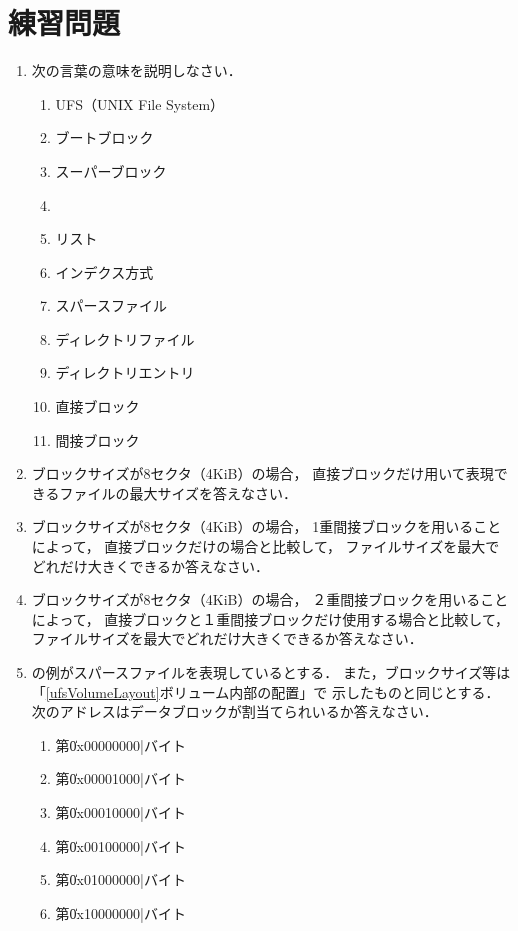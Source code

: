 \section*{練習問題}
\begin{enumerate}
  \renewcommand{\labelenumi}{\ttfamily\arabic{chapter}.\arabic{enumi}}
  \setlength{\leftskip}{1em}
\item 次の言葉の意味を説明しなさい．
  \begin{enumerate}
  \item UFS（UNIX File System）
  \item ブートブロック
  \item スーパーブロック
  \item \inode
  \item \inode リスト
  \item インデクス方式
  \item スパースファイル
  \item ディレクトリファイル
  \item ディレクトリエントリ
  \item 直接ブロック
  \item 間接ブロック
  \end{enumerate}
\item ブロックサイズが8セクタ（4KiB）の場合，
  直接ブロックだけ用いて表現できるファイルの最大サイズを答えなさい．
\item ブロックサイズが8セクタ（4KiB）の場合，
  1重間接ブロックを用いることによって，
  直接ブロックだけの場合と比較して，
  ファイルサイズを最大でどれだけ大きくできるか答えなさい．
\item ブロックサイズが8セクタ（4KiB）の場合，
  ２重間接ブロックを用いることによって，
  直接ブロックと１重間接ブロックだけ使用する場合と比較して，
  ファイルサイズを最大でどれだけ大きくできるか答えなさい．
\item {}の例がスパースファイルを表現しているとする．
  また，ブロックサイズ等は「\ref{ufsVolumeLayout}ボリューム内部の配置」で
  示したものと同じとする．
  次のアドレスはデータブロックが割当てられいるか答えなさい．
  \begin{enumerate}
    \item 第\|0x00000000|バイト
    \item 第\|0x00001000|バイト
    \item 第\|0x00010000|バイト
    \item 第\|0x00100000|バイト
    \item 第\|0x01000000|バイト
    \item 第\|0x10000000|バイト
  \end{enumerate}
\end{enumerate}
